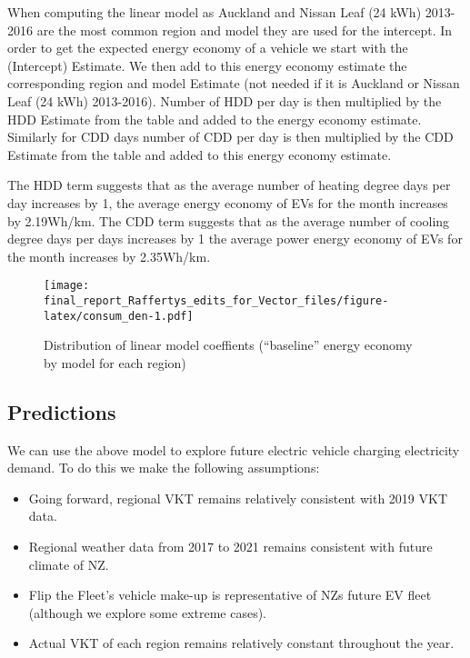 \documentclass[
]{article}
\begin{document}
When computing the linear model as Auckland and Nissan Leaf (24 kWh)
2013-2016 are the most common region and model they are used for the
intercept. In order to get the expected energy economy of a vehicle we
start with the (Intercept) Estimate. We then add to this energy economy
estimate the corresponding region and model Estimate (not needed if it
is Auckland or Nissan Leaf (24 kWh) 2013-2016). Number of HDD per day is
then multiplied by the HDD Estimate from the table and added to the
energy economy estimate. Similarly for CDD days number of CDD per day is
then multiplied by the CDD Estimate from the table and added to this
energy economy estimate.

The HDD term suggests that as the average number of heating degree days
per day increases by 1, the average energy economy of EVs for the month
increases by 2.19Wh/km. The CDD term suggests that as the average number
of cooling degree days per days increases by 1 the average power energy
economy of EVs for the month increases by 2.35Wh/km.

\begin{figure}
\centering
\texttt{[image: final\_report\_Raffertys\_edits\_for\_Vector\_files/figure-latex/consum\_den-1.pdf]}
\caption{Distribution of linear model coeffients (``baseline'' energy
economy by model for each region)\label{fig:consum_den}}
\end{figure}

\hypertarget{predictions}{%
\subsection{Predictions}\label{predictions}}

We can use the above model to explore future electric vehicle charging
electricity demand. To do this we make the following assumptions:

\begin{itemize}
\item Going forward, regional VKT remains relatively consistent with 2019 VKT data. 
\item Regional weather data from 2017 to 2021 remains consistent with future climate of NZ.
\item Flip the Fleet's vehicle make-up is representative of NZs future EV fleet (although we explore some extreme cases).
\item Actual VKT of each region remains relatively constant throughout the year.
\end{itemize}
\end{document}
